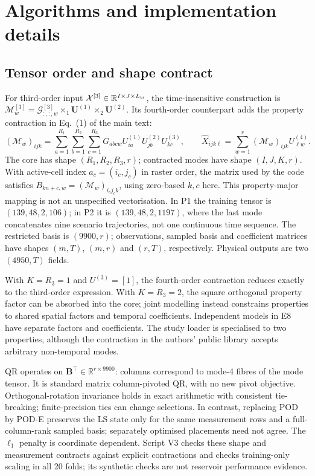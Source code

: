 \section{Algorithms and implementation details}
\label{sec:S_algorithms}

\subsection{Tensor order and shape contract}
For third-order input $\mathcal{X}^{[3]}\in\mathbb{R}^{I\times J\times L_{\rm tr}}$, the time-insensitive construction is $\mathcal{M}^{[3]}_w=\mathcal{G}^{[3]}_{:,:,w}\times_1\mathbf{U}^{(1)}\times_2\mathbf{U}^{(2)}$. Its fourth-order counterpart adds the property contraction in Eq.~(1) of the main text:
\[
 (\mathcal{M}_w)_{ijk}=\sum_{a=1}^{R_1}\sum_{b=1}^{R_2}\sum_{c=1}^{R_3}
 G_{abcw}U^{(1)}_{ia}U^{(2)}_{jb}U^{(3)}_{kc},\qquad
 \hat{X}_{ijk\ell}=\sum_{w=1}^r(\mathcal{M}_w)_{ijk}U^{(4)}_{\ell w}.
\]
The core has shape $(R_1,R_2,R_3,r)$; contracted modes have shape $(I,J,K,r)$. With active-cell index $a_c=(i_c,j_c)$ in raster order, the matrix used by the code satisfies $B_{kn+c,w}=(\mathcal{M}_w)_{i_cj_ck}$, using zero-based $k,c$ here. This property-major mapping is not an unspecified vectorisation. In P1 the training tensor is $(139,48,2,106)$; in P2 it is $(139,48,2,1197)$, where the last mode concatenates nine scenario trajectories, not one continuous time sequence. The restricted basis is $(9900,r)$; observations, sampled basis and coefficient matrices have shapes $(m,T)$, $(m,r)$ and $(r,T)$, respectively. Physical outputs are two $(4950,T)$ fields.

With $K=R_3=1$ and $U^{(3)}=[1]$, the fourth-order contraction reduces exactly to the third-order expression. With $K=R_3=2$, the square orthogonal property factor can be absorbed into the core; joint modelling instead constrains properties to shared spatial factors and temporal coefficients. Independent models in E8 have separate factors and coefficients. The study loader is specialised to two properties, although the contraction in the authors' public library accepts arbitrary non-temporal modes.

QR operates on $\mathbf{B}^\top\in\mathbb{R}^{r\times9900}$: columns correspond to mode-4 fibres of the mode tensor. It is standard matrix column-pivoted QR, with no new pivot objective. Orthogonal-rotation invariance holds in exact arithmetic with consistent tie-breaking; finite-precision ties can change selections. In contrast, replacing POD by POD-E preserves the LS state only for the same measurement rows and a full-column-rank sampled basis; separately optimised placements need not agree. The $\ell_1$ penalty is coordinate dependent. Script V3 checks these shape and measurement contracts against explicit contractions and checks training-only scaling in all 20 folds; its synthetic checks are not reservoir performance evidence.

